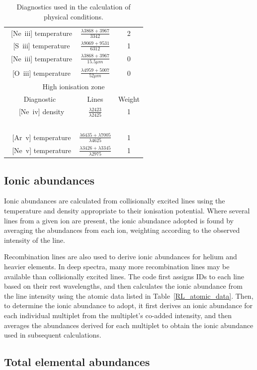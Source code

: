 \documentclass[useAMS,usenatbib]{mn2e}
\begin{document}
\begin{table}
\begin{tabular}{ccc}
~[Ne~{\sc iii}] temperature & $\frac{\lambda 3868 + 3967}{3342}$ & 2\\
~[S~{\sc iii}] temperature & $\frac{\lambda 9069 + 9531}{6312}$ & 1\\
~[Ne~{\sc iii}] temperature & $\frac{\lambda 3868 + 3967}{15.5 \mu m}$ & 0\\
~[O~{\sc iii}] temperature & $\frac{\lambda 4959 + 5007}{52 \mu m}$ & 0\\
\hline
\multicolumn{3}{c}{High ionisation zone}\\
\hline
Diagnostic & Lines & Weight \\
~[Ne~{\sc iv}] density & $\frac{\lambda2423}{\lambda2425}$ & 1 \\
~\\
~[Ar~{\sc v}] temperature & $\frac{\lambda 6435 + \lambda7005}{\lambda4625}$ & 1 \\
~[Ne~{\sc v}] temperature & $\frac{\lambda 3426 + \lambda3345}{\lambda2975}$ & 1 \\
\end{tabular}
\label{zonestable}
\caption{Diagnostics used in the calculation of physical conditions.}
\end{table}

\subsection{Ionic abundances}

Ionic abundances are calculated from collisionally excited lines using the temperature and density appropriate to their ionisation potential.  Where several lines from a given ion are present, the ionic abundance adopted is found by averaging the abundances from each ion, weighting according to the observed intensity of the line.

Recombination lines are also used to derive ionic abundances for helium and heavier elements.  In deep spectra, many more recombination lines may be available than collisionally excited lines.  The code first assigns IDs to each line based on their rest wavelengths, and then calculates the ionic abundance from the line intensity using the atomic data listed in Table~\ref{RL_atomic_data}.  Then, to determine the ionic abundance to adopt, it first derives an ionic abundance for each individual multiplet from the multiplet's co-added intensity, and then averages the abundances derived for each multiplet to obtain the ionic abundance used in subsequent calculations.

\subsection{Total elemental abundances}
\end{document}
